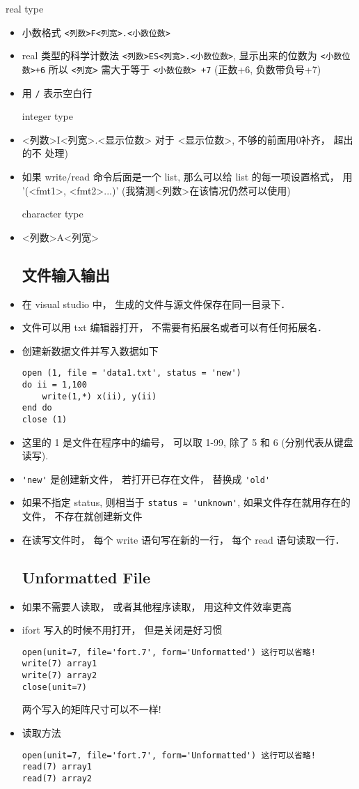 real type
\begin{itemize}
\item 小数格式 \verb|<列数>F<列宽>.<小数位数>|
\item real 类型的科学计数法  \verb|<列数>ES<列宽>.<小数位数>|, 显示出来的位数为 \verb|<小数位数>+6|
  所以 \verb|<列宽>| 需大于等于 \verb|<小数位数> +7| (正数+6, 负数带负号+7)
\item 用 \verb|/| 表示空白行

integer type
\item <列数>I<列宽>.<显示位数>  对于 <显示位数>, 不够的前面用0补齐， 超出的不
   处理)
\item 如果 write/read 命令后面是一个 list, 那么可以给 list 的每一项设置格式， 用 '(<fmt1>, <fmt2>...)'  (我猜测<列数>在该情况仍然可以使用)

character type
\item <列数>A<列宽>

\subsection{文件输入输出}
\item 在 visual studio 中， 生成的文件与源文件保存在同一目录下．
\item 文件可以用 txt 编辑器打开， 不需要有拓展名或者可以有任何拓展名．
\item 创建新数据文件并写入数据如下
\begin{lstlisting}
open (1, file = 'data1.txt', status = 'new')
do ii = 1,100
	write(1,*) x(ii), y(ii)
end do
close (1)
\end{lstlisting}
\item 这里的 1 是文件在程序中的编号， 可以取 1-99, 除了 5 和 6 (分别代表从键盘读写).
\item \verb|'new'| 是创建新文件， 若打开已存在文件， 替换成 \verb|'old'|
\item 如果不指定 status, 则相当于 \verb|status = 'unknown'|, 如果文件存在就用存在的文件， 不存在就创建新文件
\item 在读写文件时， 每个 write 语句写在新的一行， 每个 read 语句读取一行．

\subsection{Unformatted File}
\item 如果不需要人读取， 或者其他程序读取， 用这种文件效率更高
\item ifort 写入的时候不用打开， 但是关闭是好习惯
\begin{lstlisting}
open(unit=7, file='fort.7', form='Unformatted') 这行可以省略!
write(7) array1
write(7) array2
close(unit=7)
\end{lstlisting}
两个写入的矩阵尺寸可以不一样!

\item 读取方法
\begin{lstlisting}
open(unit=7, file='fort.7', form='Unformatted') 这行可以省略!
read(7) array1
read(7) array2
\end{lstlisting}
\end{itemize}

